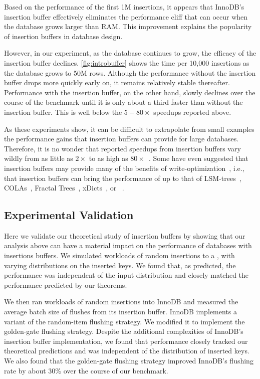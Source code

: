 Based on the performance of the first 1M insertions, it appears that InnoDB's
insertion buffer effectively eliminates the performance cliff that can occur
when the database grows larger than RAM.  This improvement explains the
popularity of insertion buffers in database design.

However, in our experiment, as the database continues to grow, the efficacy of
the insertion buffer declines.  \cref{fig:introbuffer} shows the time per
10,000 insertions as the database grows to 50M rows.  Although the performance
without the insertion buffer drops more quickly early on, it remains relatively
stable thereafter.  Performance with the insertion buffer, on the other hand,
slowly declines over the course of the benchmark until it is only about a third
faster than without the insertion buffer.  This is well below the $5-80\times$
speedups reported above.



As these experiments show, it can be difficult to extrapolate from small
examples the performance gains that insertion buffers can provide for large
databases. Therefore, it is no wonder that reported speedups from insertion
buffers vary wildly from as little as $2\times$ to as high as
$80\times$~\cite{Callaghan11}.  Some have even suggested that insertion buffers
may provide many of the benefits of write-optimization~\cite{Callaghan10},
i.e., that insertion buffers can bring the performance of \btrees{} up to that
of LSM-trees~\cite{DBLP:journals/acta/ONeilCGO96}, COLAs~\cite{DBLP:conf/spaa/BenderFFFKN07}, Fractal
Trees~\cite{Tokutek14}, xDicts~\cite{DBLP:conf/soda/BrodalDFILM10}, or
\betrees{}~\cite{DBLP:conf/soda/BrodalF03}.

\subsection{Experimental Validation}
Here we validate our theoretical study of insertion buffers by showing that our
analysis above can have a material impact on the performance of databases with
insertions buffers.  We simulated workloads of random insertions to a \btree{},
with varying distributions on the inserted keys.  We found that, as predicted,
the performance was independent of the input distribution and closely matched
the performance predicted by our theorems.

We then ran workloads of random insertions into InnoDB and measured the average
batch size of flushes from its insertion buffer.  InnoDB implements a variant
of the random-item flushing strategy.  We modified it to implement the
golden-gate flushing strategy.  Despite the additional complexities of InnoDB's
insertion buffer implementation, we found that performance closely tracked our
theoretical predictions and was independent of the distribution of inserted
keys.  We also found that the golden-gate flushing strategy improved InnoDB's
flushing rate by about 30\% over the course of our benchmark.

